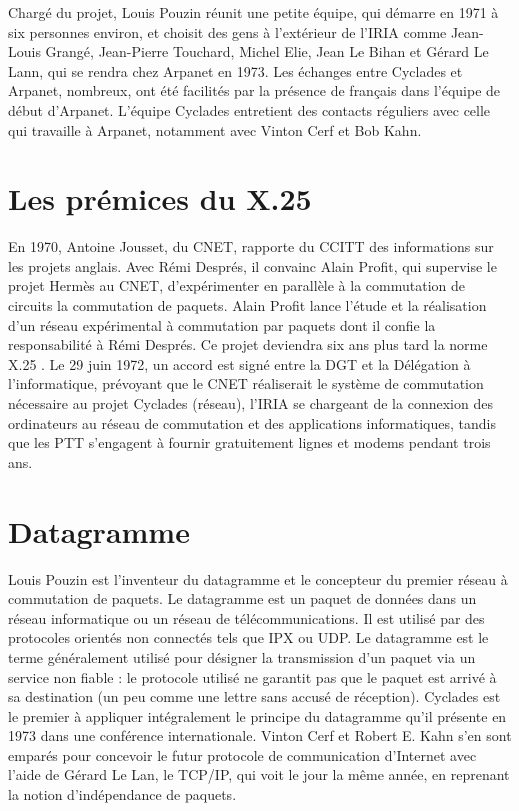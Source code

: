 \documentclass[12pt]{report}
\begin{document}
Chargé du projet, Louis Pouzin réunit une petite équipe, qui démarre en 1971 à six personnes environ, et choisit des gens à l’extérieur de l’IRIA comme Jean-Louis Grangé, Jean-Pierre Touchard, Michel Elie, Jean Le Bihan et Gérard Le Lann, qui se rendra chez Arpanet en 1973. Les échanges entre Cyclades et Arpanet, nombreux, ont été facilités par la présence de français dans l'équipe de début d'Arpanet. L'équipe Cyclades entretient des contacts réguliers avec celle qui travaille à Arpanet, notamment avec Vinton Cerf et Bob Kahn.

\section{Les prémices du X.25}

En 1970, Antoine Jousset, du \gls{CNET}, rapporte du \gls{CCITT} des informations sur les projets anglais. Avec Rémi Després, il convainc Alain Profit, qui supervise le projet Hermès au CNET, d’expérimenter en parallèle à la commutation de circuits la commutation de paquets. Alain Profit lance l'étude et la réalisation d'un réseau expérimental à commutation par paquets dont il confie la responsabilité à Rémi Després. Ce projet deviendra six ans plus tard la norme X.25 \cite{wikicnet}. Le 29 juin 1972, un accord est signé entre la DGT et la Délégation à l’informatique, prévoyant que le CNET réaliserait le système de commutation nécessaire au projet Cyclades (réseau), l’IRIA se chargeant de la connexion des ordinateurs au réseau de commutation et des applications informatiques, tandis que les \gls{PTT} s’engagent à fournir gratuitement lignes et modems pendant trois ans.

\section{Datagramme}

Louis Pouzin est l'inventeur du datagramme et le concepteur du premier réseau à commutation de paquets.
Le datagramme est un paquet de données dans un réseau informatique ou un réseau de télécommunications. Il est utilisé par des protocoles orientés \og non connectés \fg tels que IPX ou UDP. Le datagramme est le terme généralement utilisé pour désigner la transmission d'un paquet via un service non \og fiable \fg : le protocole utilisé ne garantit pas que le paquet est arrivé à sa destination (un peu comme une lettre sans accusé de réception). Cyclades est le premier à appliquer intégralement le principe du datagramme  qu'il présente en 1973 dans une conférence internationale. Vinton Cerf et Robert E. Kahn s'en sont emparés pour concevoir le futur protocole de communication d'Internet avec l'aide de Gérard Le Lan, le TCP/IP, qui voit le jour la même année, en reprenant la notion d'indépendance de paquets\cite{wikidtg}.
\end{document}
